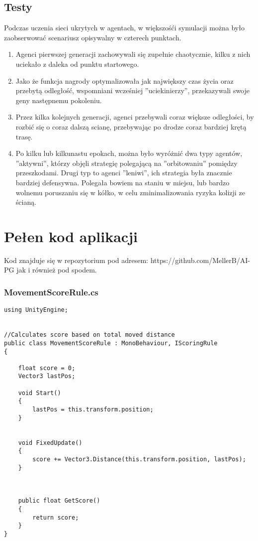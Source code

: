 \documentclass[12pt,a4paper]{article}
\begin{document}
\subsection*{Testy}
Podczas uczenia sieci ukrytych w agentach, w większośći symulacji można było zaobserwować scenariusz opisywalny w czterech punktach.
\begin{enumerate}
\item Agenci pierwszej generacji zachowywali się zupełnie chaotycznie, kilku z nich uciekało z daleka od punktu startowego.
\item Jako że funkcja nagrody optymalizowała jak największy czas życia oraz przebytą odległość, wspomniani wcześniej ''uciekinierzy'', przekazywali swoje geny następnemu pokoleniu.
\item Przez kilka kolejnych generacji, agenci przebywali coraz większe odległości, by rozbić się o coraz dalszą scianę, przebywając po drodze coraz bardziej krętą trasę.
\item Po kilku lub kilkunastu epokach, można było wyróżnić dwa typy agentów, ''aktywni'', którzy objęli strategię polegającą na ''orbitowaniu'' pomiędzy przeszkodami. Drugi typ to agenci ''leniwi'', ich strategia była znacznie bardziej defensywna. Polegała bowiem na staniu w miejsu, lub bardzo wolnemu poruszaniu się w kółko, w celu zminimalizowania ryzyka kolizji ze ścianą.

\end{enumerate}

\newpage
\section*{Pełen kod aplikacji}
Kod znajduje się w repozytorium pod adresem: https://github.com/MellerB/AI-PG
jak i również pod spodem.



\subsubsection*{MovementScoreRule.cs}
\begin{lstlisting}
using UnityEngine;


//Calculates score based on total moved distance
public class MovementScoreRule : MonoBehaviour, IScoringRule
{

    float score = 0;
    Vector3 lastPos;

    void Start()
    {
        lastPos = this.transform.position;
    }


    void FixedUpdate()
    {
        score += Vector3.Distance(this.transform.position, lastPos);
    }



    public float GetScore()
    {
        return score;
    }
}\end{lstlisting}
\pagebreak
\end{document}
